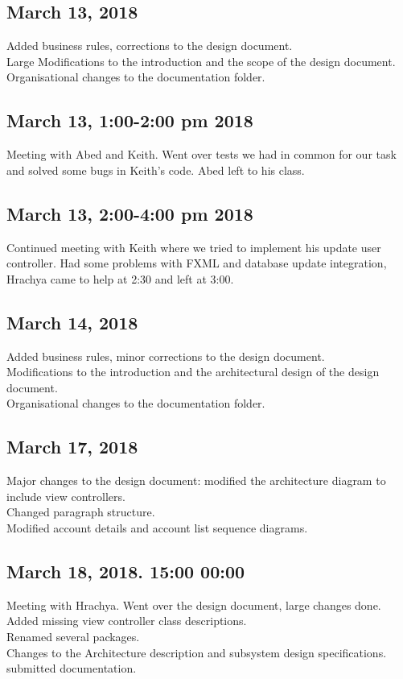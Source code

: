 \documentclass[12pt]{article}
\begin{document}
 \subsection*{March 13,  2018}
Added business rules, corrections to the design document. \\
Large Modifications to the introduction and the scope of the design document. \\
Organisational changes to the documentation folder.

\subsection*{March 13, 1:00-2:00 pm 2018}
Meeting with Abed and Keith. Went over tests we had in common for our task and solved some bugs in Keith's code. Abed left to his class.

\subsection*{March 13, 2:00-4:00 pm 2018}
Continued meeting with Keith where we tried to implement his update user controller. Had some problems with FXML and database update integration, Hrachya came to help at 2:30 and left at 3:00.

 \subsection*{March 14,  2018}
Added business rules, minor corrections to the design document. \\
Modifications to the introduction and the architectural design of the design document. \\
Organisational changes to the documentation folder.

 \subsection*{March 17,  2018}
Major changes to the design document: modified the architecture diagram to include view controllers. \\ Changed paragraph structure. \\
Modified account details and account list sequence diagrams.

 \subsection*{March 18,  2018. 15:00 00:00}
Meeting with Hrachya. Went over the design document, large changes done. \\
Added missing view controller class descriptions. \\
Renamed several packages. \\
Changes to the Architecture description and subsystem design specifications. \\
submitted documentation.
\end{document}
